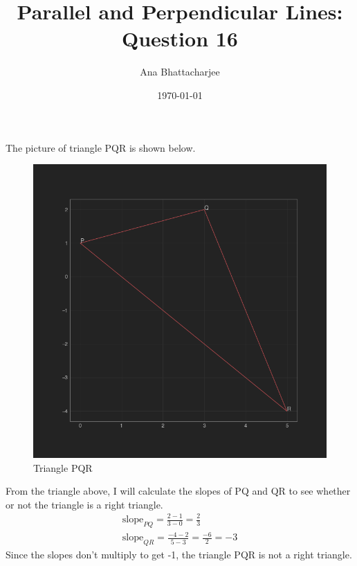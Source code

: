 \documentclass{article}
\begin{document}
\author{Ana Bhattacharjee}
\title{Parallel and Perpendicular Lines: Question 16}
\date{\today}
\maketitle{}

\begin{center}
The picture of triangle PQR is shown below.
\par
\begin{figure}[!htbp]
  \includegraphics[width=1.0\columnwidth]{polygon}
  \caption{Triangle PQR}
\end{figure}
\par
From the triangle above, I will calculate the slopes of PQ and QR to see whether or not the triangle is a right triangle.
\begin{align}
  \text{slope}_{PQ} = \frac{2 - 1}{3 - 0} = \frac{2}{3} \\
  \text{slope}_{QR} = \frac{-4 - 2}{5 - 3} = \frac{-6}{2} = -3
\end{align}
Since the slopes don't multiply to get -1, the triangle PQR is not a right triangle. 
\end{center}
\end{document}
